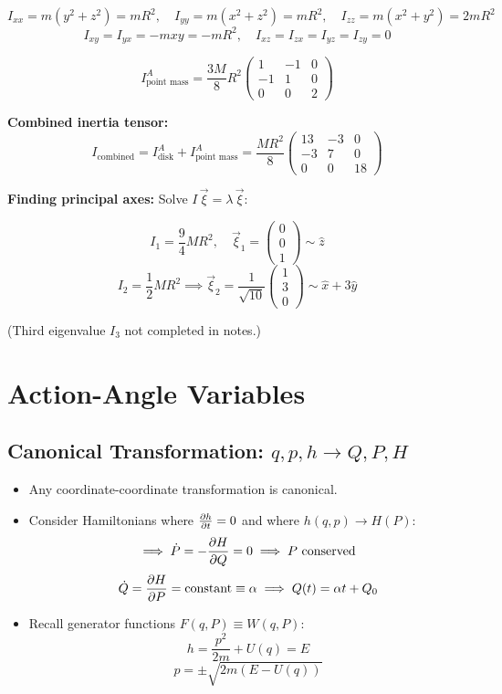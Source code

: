 \[
    I_{xx} = m(y^2+z^2) = mR^2,\quad
    I_{yy} = m(x^2+z^2) = mR^2,\quad
    I_{zz} = m(x^2+y^2) = 2mR^2
\]
\[
    I_{xy} = I_{yx} = -mxy = -mR^2,\quad
    I_{xz} = I_{zx} = I_{yz} = I_{zy} = 0
\]

\[
    I_{\text{point mass}}^A = \frac{3M}{8}R^2\begin{pmatrix}1&-1&0\\-1&1&0\\0&0&2\end{pmatrix}
\]

\textbf{Combined inertia tensor:}
\[
    I_{\text{combined}} = I_{\text{disk}}^A + I_{\text{point mass}}^A
    = \frac{MR^2}{8}\begin{pmatrix}13&-3&0\\-3&7&0\\0&0&18\end{pmatrix}
\]

\textbf{Finding principal axes:} Solve $I\,\vec{\xi} = \lambda\,\vec{\xi}$:

\[
    I_1 = \frac{9}{4}MR^2,\quad \vec{\xi}_1 = \begin{pmatrix}0\\0\\1\end{pmatrix} \sim \hat{z}
\]
\[
    I_2 = \frac{1}{2}MR^2 \implies \vec{\xi}_2 = \frac{1}{\sqrt{10}}\begin{pmatrix}1\\3\\0\end{pmatrix} \sim \hat{x}+3\hat{y}
\]

(Third eigenvalue $I_3$ not completed in notes.)

\chapter{Action-Angle Variables}


\section{Canonical Transformation: $q,p,h \to Q,P,H$}

\begin{itemize}
    \item Any coordinate-coordinate transformation is canonical.
    \item Consider Hamiltonians where $\pdv{h}{t} = 0$ and where $h(q,p) \to H(P)$:
    \[
        \implies \dot{P} = -\pdv{H}{Q} = 0 \implies P\text{ conserved}
    \]
    \[
        \dot{Q} = \pdv{H}{P} = \text{constant} \equiv \alpha \implies Q(t) = \alpha t + Q_0
    \]
    \item Recall generator functions $F(q,P) \equiv W(q,P)$:
    \[
        h = \frac{p^2}{2m} + U(q) = E
    \]
    \[
        p = \pm\sqrt{2m(E-U(q))}
    \]
\end{itemize}

